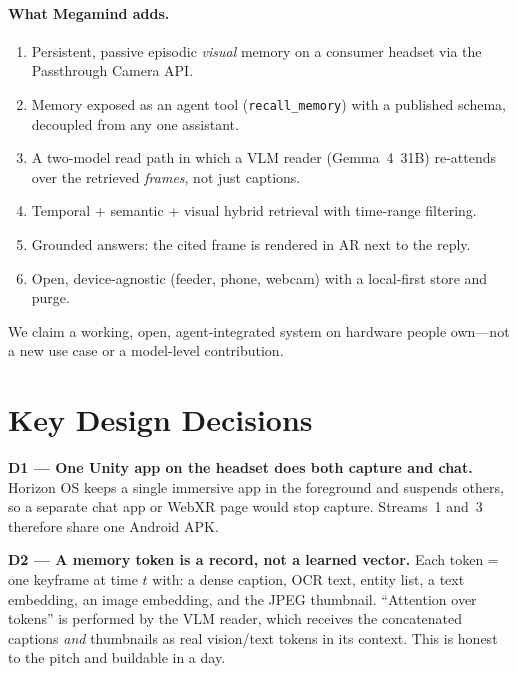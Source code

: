 \documentclass[11pt,a4paper]{article}
\begin{document}
\paragraph{What Megamind adds.}
\begin{enumerate}
  \item Persistent, passive episodic \emph{visual} memory on a consumer headset via the Passthrough Camera API.
  \item Memory exposed as an agent tool (\texttt{recall\_memory}) with a published schema, decoupled from any one assistant.
  \item A two-model read path in which a VLM reader (Gemma~4~31B) re-attends over the retrieved \emph{frames}, not just captions.
  \item Temporal + semantic + visual hybrid retrieval with time-range filtering.
  \item Grounded answers: the cited frame is rendered in AR next to the reply.
  \item Open, device-agnostic (feeder, phone, webcam) with a local-first store and purge.
\end{enumerate}
We claim a working, open, agent-integrated system on hardware people own---not a new use case or a model-level contribution.

\section{Key Design Decisions}

\begin{decision}
\textbf{D1 --- One Unity app on the headset does both capture and chat.}
Horizon OS keeps a single immersive app in the foreground and suspends others, so a separate chat app or WebXR page would stop capture. Streams~1 and~3 therefore share one Android APK.
\end{decision}

\begin{decision}
\textbf{D2 --- A memory token is a record, not a learned vector.}
Each token = one keyframe at time $t$ with: a dense caption, OCR text, entity list, a text embedding, an image embedding, and the JPEG thumbnail. ``Attention over tokens'' is performed by the VLM reader, which receives the concatenated captions \emph{and} thumbnails as real vision/text tokens in its context. This is honest to the pitch and buildable in a day.
\end{decision}
\end{document}
